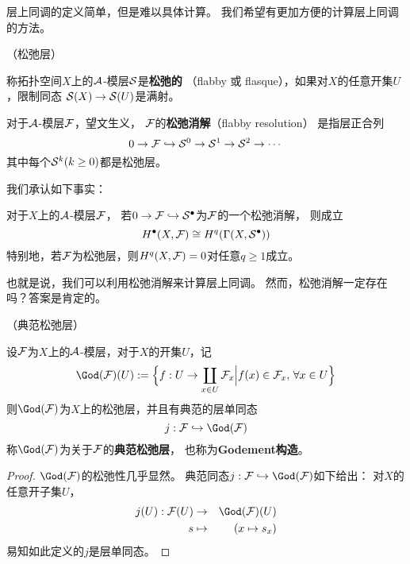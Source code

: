
层上同调的定义简单，但是难以具体计算。
我们希望有更加方便的计算层上同调的方法。

\begin{definition}（松弛层）

称拓扑空间$X$上的$\mathcal{A}$-模层$\mathcal{S}$是\textbf{松弛的}
（flabby 或 flasque），如果对$X$的任意开集$U$，限制同态
$\mathcal{S}(X)\to\mathcal{S}(U)$是满射。
\end{definition}

对于$\mathcal{A}$-模层$\mathcal{F}$，望文生义，
$\mathcal{F}$的\textbf{松弛消解}（flabby resolution）
是指层正合列
$$
  0\to\mathcal{F}\hookrightarrow\mathcal{S}^0
  \to\mathcal{S}^1\to\mathcal{S}^2\to\cdots
$$
其中每个$\mathcal{S}^k(k\geq 0)$都是松弛层。

我们承认如下事实：

\begin{thm}对于$X$上的$\mathcal{A}$-模层$\mathcal{F}$，
若$0\to\mathcal{F}\hookrightarrow\mathcal{S}^{\bullet}$为$\mathcal{F}$的一个松弛消解，
则成立
$$
  H^{\bullet}(X,\mathcal{F})\cong H^q(\Gamma(X,\mathcal{S}^{\bullet}))
$$
特别地，若$\mathcal{F}$为松弛层，则$H^q(X,\mathcal{F})=0$对任意$q\geq 1$成立。
\end{thm}

也就是说，我们可以利用松弛消解来计算层上同调。
然而，松弛消解一定存在吗？答案是肯定的。

\begin{notation}（典范松弛层）

设$\mathcal{F}$为$X$上的$\mathcal{A}$-模层，对于$X$的开集$U$，记
$$
  \God(\mcalF)(U)
:=
  \Bigset
  {f:U\to\coprod_{x\in U}\mcalF_x}
  {f(x)\in\mcalF_x,\,\forall x\in U}
$$
则$\God(\mcalF)$为$X$上的松弛层，并且有典范的层单同态
$$j:\mcalF\inj\God(\mcalF)$$
称$\God(\mcalF)$为关于$\mathcal{F}$的\textbf{典范松弛层}，
也称为\textbf{Godement构造}。
\end{notation}

\begin{proof}
$\God(\mcalF)$的松弛性几乎显然。
典范同态$j:\mcalF\inj\God(\mcalF)$如下给出：
对$X$的任意开子集$U$，
\begin{eqnarray*}
  j(U):\mcalF(U)&\to&\God(\mcalF)(U)\\
  s&\mapsto&(x\mapsto s_x)
\end{eqnarray*}
易知如此定义的$j$是层单同态。
\end{proof}

